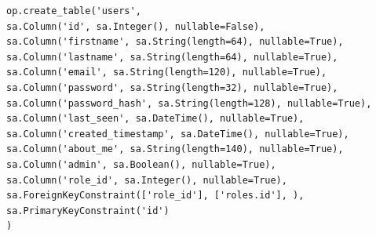 \begin{lstlisting}
op.create_table('users',
sa.Column('id', sa.Integer(), nullable=False),
sa.Column('firstname', sa.String(length=64), nullable=True),
sa.Column('lastname', sa.String(length=64), nullable=True),
sa.Column('email', sa.String(length=120), nullable=True),
sa.Column('password', sa.String(length=32), nullable=True),
sa.Column('password_hash', sa.String(length=128), nullable=True),
sa.Column('last_seen', sa.DateTime(), nullable=True),
sa.Column('created_timestamp', sa.DateTime(), nullable=True),
sa.Column('about_me', sa.String(length=140), nullable=True),
sa.Column('admin', sa.Boolean(), nullable=True),
sa.Column('role_id', sa.Integer(), nullable=True),
sa.ForeignKeyConstraint(['role_id'], ['roles.id'], ),
sa.PrimaryKeyConstraint('id')
)
\end{lstlisting}

